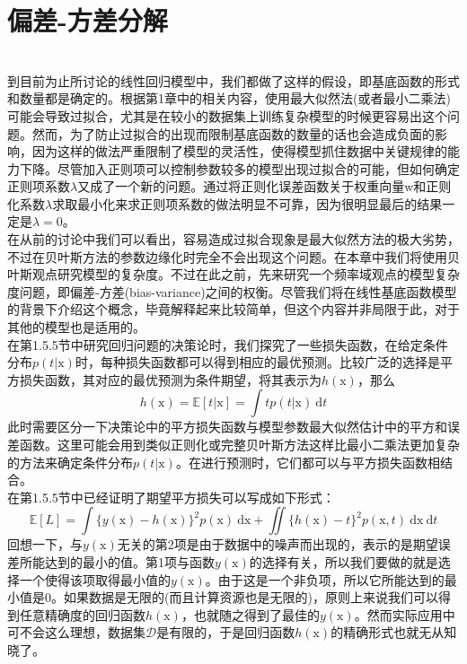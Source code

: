 \documentclass[b5paper]{book}
\numberwithin{equation}{chapter}
\newcommand {\bx} {\boldsymbol{\mathrm{x}}}
\newcommand {\bw} {\boldsymbol{\mathrm{w}}}
\newcommand {\insertline} {\noindent{\color{red} \rule[5pt]{\textwidth}{0.1em}}}
\begin{document}
	\section{偏差-方差分解}
	\insertline\\
	\textnormal{
	\indent 到目前为止所讨论的线性回归模型中，我们都做了这样的假设，即基底函数的形式和数量都是确定的。根据第1章中的相关内容，使用最大似然法(或者最小二乘法)可能会导致过拟合，尤其是在较小的数据集上训练复杂模型的时候更容易出这个问题。然而，为了防止过拟合的出现而限制基底函数的数量的话也会造成负面的影响，因为这样的做法严重限制了模型的灵活性，使得模型抓住数据中关键规律的能力下降。尽管加入正则项可以控制参数较多的模型出现过拟合的可能，但如何确定正则项系数$\lambda$又成了一个新的问题。通过将正则化误差函数关于权重向量$\bw$和正则化系数$\lambda$求取最小化来求正则项系数的做法明显不可靠，因为很明显最后的结果一定是$\lambda = 0$。\\
	\indent 在从前的讨论中我们可以看出，容易造成过拟合现象是最大似然方法的极大劣势，不过在贝叶斯方法的参数边缘化时完全不会出现这个问题。在本章中我们将使用贝叶斯观点研究模型的复杂度。不过在此之前，先来研究一个频率域观点的模型复杂度问题，即偏差-方差(bias-variance)之间的权衡。尽管我们将在线性基底函数模型的背景下介绍这个概念，毕竟解释起来比较简单，但这个内容并非局限于此，对于其他的模型也是适用的。\\
	\indent 在第1.5.5节中研究回归问题的决策论时，我们探究了一些损失函数，在给定条件分布$p(t|\bx)$时，每种损失函数都可以得到相应的最优预测。比较广泛的选择是平方损失函数，其对应的最优预测为条件期望，将其表示为$h(\bx)$，那么
	\begin{equation}
		h(\bx) = \mathbb{E}[t|\bx] = \int t p(t|\bx)\ \mathrm{d}t
	\end{equation}
	此时需要区分一下决策论中的平方损失函数与模型参数最大似然估计中的平方和误差函数。这里可能会用到类似正则化或完整贝叶斯方法这样比最小二乘法更加复杂的方法来确定条件分布$p(t|\bx)$。在进行预测时，它们都可以与平方损失函数相结合。\\
	\indent 在第1.5.5节中已经证明了期望平方损失可以写成如下形式：
	\begin{equation}
		\mathbb{E}[L]=\int \{y(\bx) - h(\bx)\}^2 p(\bx)\ \mathrm{d}\bx + \iint \{h(\bx)-t\}^2 p(\bx, t)\ \mathrm{d}\bx \ \mathrm{d}t
	\end{equation}
	回想一下，与$y(\bx)$无关的第2项是由于数据中的噪声而出现的，表示的是期望误差所能达到的最小的值。第1项与函数$y(\bx)$的选择有关，所以我们要做的就是选择一个使得该项取得最小值的$y(\bx)$。由于这是一个非负项，所以它所能达到的最小值是0。如果数据是无限的(而且计算资源也是无限的)，原则上来说我们可以得到任意精确度的回归函数$h(\bx)$，也就随之得到了最佳的$y(\bx)$。然而实际应用中可不会这么理想，数据集$\mathcal{D}$是有限的，于是回归函数$h(\bx)$的精确形式也就无从知晓了。\\
}
\end{document}
